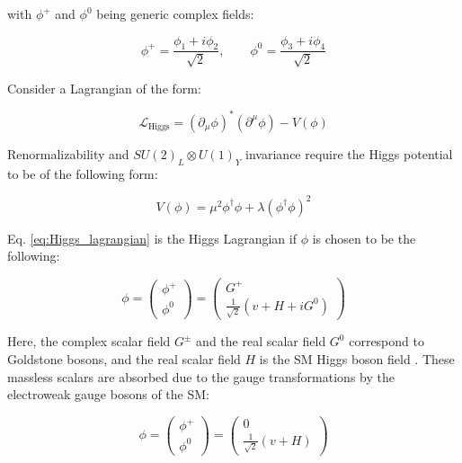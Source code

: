 			\noindent with $\phi^+$ and $\phi^0$ being generic complex fields: 

			\begin{equation}
				\phi^+ = \frac{\phi_1 + i \phi_2}{\sqrt{2}},  \qquad \phi^0 = \frac{\phi_3 + i \phi_4}{\sqrt{2}}
			\end{equation}

			Consider a Lagrangian of the form: 

			\begin{equation}
			\label{eq:Higgs_lagrangian}
				\mathcal{L_{\mathrm{Higgs}}} = ( \partial_{\mu} \phi )^* \left ( \partial^{\mu} \phi \right ) - V(\phi)
			\end{equation}

			\noindent Renormalizability and $SU(2)_L \otimes U(1)_Y$ invariance require the Higgs potential to be of the following form: 

			\begin{equation}
			\label{eq:Higgs_potential}
				V(\phi) = \mu^2  \phi^\dagger \phi + \lambda \left ( \phi^\dagger \phi \right )^2 
			\end{equation}

			\noindent Eq. \ref{eq:Higgs_lagrangian} is the Higgs Lagrangian if $\phi$ is chosen to be the following:

			\begin{equation*}
				\phi = 
				\begin{pmatrix}
					\phi^+ \\ \phi^0
				\end{pmatrix} 
				=
				\begin{pmatrix}
					G^+ \\ \frac{1}{\sqrt{2}} \left ( v + H + iG^0 \right )
				\end{pmatrix}
			\end{equation*}

			\noindent Here, the complex scalar field $G^\pm$ and the real scalar field $G^0$ correspond to Goldstone bosons, and the real scalar field $H$ is the SM Higgs boson field \cite{Goldstone1962}. These massless scalars are absorbed due to the gauge transformations by the electroweak gauge bosons of the SM:

			\begin{equation}
			\label{eq:Higgs_doublet}
				\phi = 
				\begin{pmatrix}
					\phi^+ \\ \phi^0
				\end{pmatrix} 
				=
				\begin{pmatrix}
					0 \\ \frac{1}{\sqrt{2}} \left ( v + H \right )
				\end{pmatrix}
			\end{equation}

